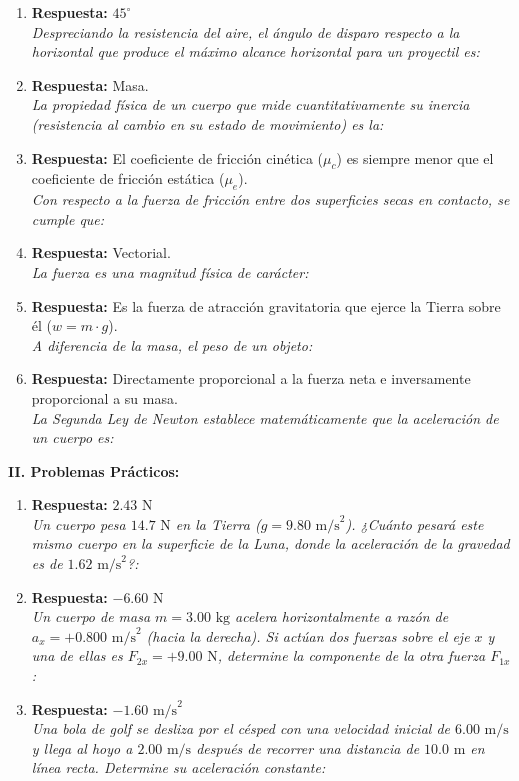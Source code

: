 \documentclass[11pt,a4paper]{article}
\begin{document}
\begin{enumerate}
    \item \textbf{Respuesta:} $45^\circ$ \\ \textit{Despreciando la resistencia del aire, el ángulo de disparo respecto a la horizontal que produce el máximo alcance horizontal para un proyectil es:}
    \item \textbf{Respuesta:} Masa. \\ \textit{La propiedad física de un cuerpo que mide cuantitativamente su inercia (resistencia al cambio en su estado de movimiento) es la:}
    \item \textbf{Respuesta:} El coeficiente de fricción cinética ($\mu_c$) es siempre menor que el coeficiente de fricción estática ($\mu_e$). \\ \textit{Con respecto a la fuerza de fricción entre dos superficies secas en contacto, se cumple que:}
    \item \textbf{Respuesta:} Vectorial. \\ \textit{La fuerza es una magnitud física de carácter:}
    \item \textbf{Respuesta:} Es la fuerza de atracción gravitatoria que ejerce la Tierra sobre él ($w = m \cdot g$). \\ \textit{A diferencia de la masa, el peso de un objeto:}
    \item \textbf{Respuesta:} Directamente proporcional a la fuerza neta e inversamente proporcional a su masa. \\ \textit{La Segunda Ley de Newton establece matemáticamente que la aceleración de un cuerpo es:}
\end{enumerate}\textbf{II. Problemas Prácticos:}\begin{enumerate}    \item \textbf{Respuesta:} $2.43 \text{ N}$ \\ \textit{Un cuerpo pesa $14.7 \text{ N}$ en la Tierra ($g = 9.80 \text{ m/s}^2$). ¿Cuánto pesará este mismo cuerpo en la superficie de la Luna, donde la aceleración de la gravedad es de $1.62 \text{ m/s}^2$?:}
    \item \textbf{Respuesta:} $-6.60 \text{ N}$ \\ \textit{Un cuerpo de masa $m = 3.00 \text{ kg}$ acelera horizontalmente a razón de $a_x = +0.800 \text{ m/s}^2$ (hacia la derecha). Si actúan dos fuerzas sobre el eje $x$ y una de ellas es $F_{2x} = +9.00 \text{ N}$, determine la componente de la otra fuerza $F_{1x}$:}
    \item \textbf{Respuesta:} $-1.60 \text{ m/s}^2$ \\ \textit{Una bola de golf se desliza por el césped con una velocidad inicial de $6.00 \text{ m/s}$ y llega al hoyo a $2.00 \text{ m/s}$ después de recorrer una distancia de $10.0 \text{ m}$ en línea recta. Determine su aceleración constante:}

\end{enumerate}
\end{document}
